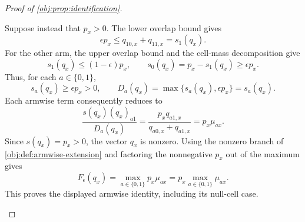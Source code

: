 \begin{proof}[Proof of \cref{obj:prop:identification}]
\begin{enumerate}
Suppose instead that \(p_x>0\). The lower overlap bound gives
\[
\epsilon p_x\le q_{10,x}+q_{11,x}=s_1(q_x).
\]
For the other arm, the upper overlap bound and the cell-mass decomposition give
\[
s_1(q_x)\le(1-\epsilon)p_x,
\qquad
s_0(q_x)=p_x-s_1(q_x)\ge\epsilon p_x.
\]
Thus, for each \(a\in\{0,1\}\),
\[
s_a(q_x)\ge\epsilon p_x>0,
\qquad
D_a(q_x)=\max\{s_a(q_x),\epsilon p_x\}=s_a(q_x).
\]
Each armwise term consequently reduces to
\[
\frac{s(q_x)(q_x)_{a1}}{D_a(q_x)}
=
\frac{p_xq_{a1,x}}{q_{a0,x}+q_{a1,x}}
=
p_x\mu_{ax}.
\]
Since \(s(q_x)=p_x>0\), the vector \(q_x\) is nonzero. Using the nonzero branch of \cref{obj:def:armwise-extension} and factoring the nonnegative \(p_x\) out of the maximum gives
\[
F_\epsilon(q_x)
=
\max_{a\in\{0,1\}}p_x\mu_{ax}
=
p_x\max_{a\in\{0,1\}}\mu_{ax}.
\]
This proves the displayed armwise identity, including its null-cell case.
\end{enumerate}
\end{proof}

